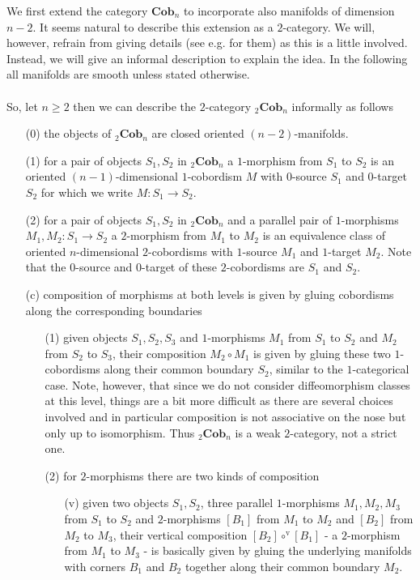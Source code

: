 We first extend the category $\mathbf{Cob}_{n}$ to incorporate also manifolds of dimension $n-2$. It seems natural to describe this extension as a $2$-category. We will, however, refrain from giving details (see e.g. \cite{d37d0fca} for them) as this is a little involved. Instead, we will give an informal description to explain the idea. In the following all manifolds are smooth unless stated otherwise.
\\\\
So, let $n \geq 2$ then we can describe the $2$-category ${_{2}}\mathbf{Cob}_{n}$ informally as follows
\begin{enumerate}
\item[(0)]
the objects of ${_{2}}\mathbf{Cob}_{n}$ are closed oriented $(n-2)$-manifolds.

\item[(1)]
for a pair of objects $S_{1},S_{2}$ in ${_{2}}\mathbf{Cob}_{n}$ a $1$-morphism from $S_{1}$ to $S_{2}$ is an oriented $(n-1)$-dimensional $1$-cobordism $M$ with $0$-source $S_{1}$ and $0$-target $S_{2}$ for which we write $M \colon S_{1} \to S_{2}$.

\item[(2)]
for a pair of objects $S_{1},S_{2}$ in ${_{2}}\mathbf{Cob}_{n}$ and a parallel pair of $1$-morphisms $M_{1},M_{2} \colon S_{1} \to S_{2}$ a $2$-morphism from $M_{1}$ to $M_{2}$ is an equivalence class of oriented $n$-dimensional $2$-cobordisms with $1$-source $M_{1}$ and $1$-target $M_{2}$. Note that the $0$-source and $0$-target of these $2$-cobordisms are $S_{1}$ and $S_{2}$.

\item[(c)]
composition of morphisms at both levels is given by gluing cobordisms along the corresponding boundaries
\begin{enumerate}
\item[(1)]
given objects $S_{1},S_{2},S_{3}$ and $1$-morphisms $M_{1}$ from $S_{1}$ to $S_{2}$ and $M_{2}$ from $S_{2}$ to $S_{3}$, their composition $M_{2} \circ M_{1}$ is given by gluing these two $1$-cobordisms along their common boundary $S_{2}$, similar to the $1$-categorical case. Note, however, that since we do not consider diffeomorphism classes at this level, things are a bit more difficult as there are several choices involved and in particular composition is not associative on the nose but only up to isomorphism. Thus ${_{2}}\mathbf{Cob}_{n}$ is a weak $2$-category, not a strict one.

\item[(2)]
for $2$-morphisms there are two kinds of composition
\begin{enumerate}
\item[(v)]
given two objects $S_{1},S_{2}$, three parallel $1$-morphisms $M_{1},M_{2},M_{3}$ from $S_{1}$ to $S_{2}$ and $2$-morphisms $[B_{1}]$ from $M_{1}$ to $M_{2}$ and $[B_{2}]$ from $M_{2}$ to $M_{3}$, their vertical composition $[B_{2}] \circ^{\mathrm{v}} [B_{1}]$ - a $2$-morphism from $M_{1}$ to $M_{3}$ - is basically given by gluing the underlying manifolds with corners $B_{1}$ and $B_{2}$ together along their common boundary $M_{2}$.


\end{enumerate}
\end{enumerate}
\end{enumerate}
